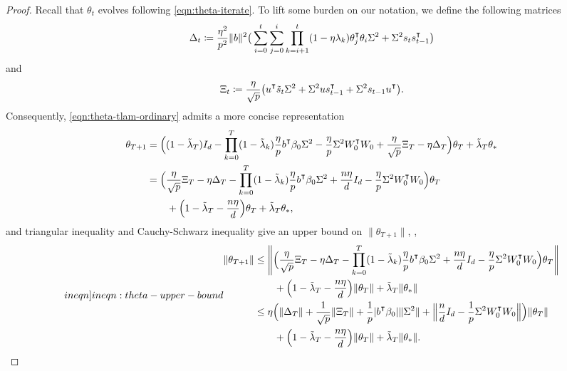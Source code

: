 \begin{proof}
Recall that $\theta_t$ evolves following \cref{eqn:theta-iterate}.
To lift some burden on our notation, we define the following matrices
\begin{align*}
    \Delta_t \defeq \frac{\eta^2}{p^2} \|b\|^2\big(\sum_{i=0}^t\sum_{j=0}^i \prod_{k=i+1}^t(1-\eta\lambda_k)\theta_j\transpose \theta_i \Sigma^2 + \Sigma^2 s_t s_{t-1}\transpose \big)
\end{align*}
and
\begin{align*}
    \Xi_t \defeq \frac{\eta}{\sqrt p}\big(u\transpose \tilde{s}_t \Sigma^2 + \Sigma^2 u s_{t-1}\transpose + \Sigma^2 s_{t-1}u\transpose\big).
\end{align*}
Consequently, \cref{eqn:theta-tlam-ordinary} admits a more concise representation
\begin{align*}
    \begin{split}
        \theta_{T+1} & = \Big((1-\tlam_T)I_d -\prod_{k=0}^T(1-\tlam_k)\frac{\eta}{p}b\transpose\beta_0 \Sigma^2 - \frac{\eta}{p}\Sigma^2 W_0\transpose W_0 + \frac{\eta}{\sqrt p}\Xi_T - \eta\Delta_T \Big)\theta_T + \tlam_T \theta_\ast \\
        & = \Big( \frac{\eta}{\sqrt p}\Xi_T - \eta\Delta_T - \prod_{k=0}^T (1-\tlam_k) \frac{\eta}{p} b\transpose\beta_0 \Sigma^2 + \frac{n\eta}{d}I_d - \frac{\eta}{p}\Sigma^2 W_0\transpose W_0 \Big)\theta_T \\
        & \qquad + \Big( 1-\tlam_T - \frac{n\eta}{d} \Big)\theta_T + \tlam_T \theta_\ast,
    \end{split}
\end{align*}
and triangular inequality and Cauchy-Schwarz inequality give an upper bound on $\|\theta_{T+1}\|$, \ie,
\begin{align}\label[ineqn]{ineqn:theta-upper-bound}
    \begin{split}
        \|\theta_{T+1}\| & \leq \left\| \Big( \frac{\eta}{\sqrt p}\Xi_T - \eta\Delta_T - \prod_{k=0}^T(1-\tlam_k)\frac{\eta}{p}b\transpose\beta_0 \Sigma^2 + \frac{n\eta}{d}I_d - \frac{\eta}{p}\Sigma^2 W_0\transpose W_0 \Big)\theta_T \right\| \\
        & \qquad + \Big( 1-\tlam_T - \frac{n\eta}{d} \Big)\|\theta_T\| + \tlam_T \|\theta_\ast\| \\
        & \leq \eta \Big( \|\Delta_T\| + \frac{1}{\sqrt p}\|\Xi_T\| + \frac{1}{p}|b\transpose\beta_0| \|\Sigma^2\| + \Big\| \frac{n}{d}I_d - \frac{1}{p}\Sigma^2 W_0\transpose W_0 \Big\| \Big) \|\theta_T\| \\
        & \qquad + \Big( 1-\tlam_T - \frac{n\eta}{d} \Big)\|\theta_T\| + \tlam_T \|\theta_\ast\|.

\end{split}
\end{align}
\end{proof}
